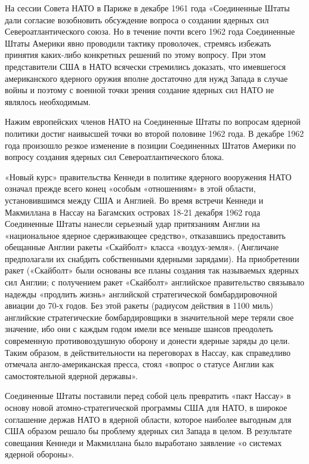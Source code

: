 \documentclass[12pt, a4paper, openany]{book}
\begin{document}
	На сессии Совета НАТО в Париже в декабре 1961 года «Соединенные Штаты дали согласие возобновить обсуждение вопроса о создании ядерных сил Североатлантического союза. Но в течение почти всего 1962 года Соединенные Штаты Америки явно проводили тактику проволочек, стремясь избежать принятия каких-либо конкретных решений по этому вопросу. При этом представители США в НАТО всячески стремились доказать, что имевшегося американского ядерного оружия вполне достаточно для нужд Запада в случае войны и поэтому с военной точки зрения создание ядерных сил НАТО не являлось необходимым.
	
	Нажим европейских членов НАТО на Соединенные Штаты по вопросам ядерной политики достиг наивысшей точки во второй половине 1962 года. В декабре 1962 года произошло резкое изменение в позиции Соединенных Штатов Америки по вопросу создания ядерных сил Североатлантического блока.
	
	«Новый курс» правительства Кеннеди в политике ядерного вооружения НАТО означал прежде всего конец «особым «отношениям» в этой области, установившимся между США и Англией. Во время встречи Кеннеди и Макмиллана в Нассау на Багамских островах 18-21 декабря 1962 года Соединенные Штаты нанесли серьезный удар притязаниям Англии на «национальное ядерное сдерживающее средство», отказавшись предоставить обещанные Англии ракеты «Скайболт» класса «воздух-земля». (Англичане предполагали их снабдить собственными ядерными зарядами). На приобретении ракет («Скайболт» были основаны все планы создания так называемых ядерных сил Англии; с получением ракет «Скайболт» английское правительство связывало надежды «продлить жизнь» английской стратегической бомбардировочной авиации до 70-х годов. Без этой ракеты (радиусом действия в 1100 миль) английские стратегические бомбардировщики в значительной мере теряли свое значение, ибо они с каждым годом имели все меньше шансов преодолеть современную противовоздушную оборону и донести ядерные заряды до цели. Таким образом, в действительности на переговорах в Нассау, как справедливо отмечала англо-американская пресса, стоял «вопрос о статусе Англии как самостоятельной ядерной державы».
	
	Соединенные Штаты поставили перед собой цель превратить «пакт Нассау» в основу новой атомно-стратегической программы США для НАТО, в широкое соглашение держав НАТО в ядерной области, которое наиболее выгодным для США образом решало бы проблему ядерных сил Запада в целом. В результате совещания Кеннеди и Макмиллана было выработано заявление «о системах ядерной обороны».
	
\end{document}
